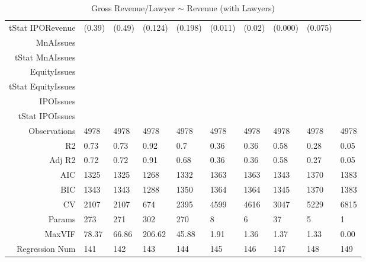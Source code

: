 \begin{table}[ht]
\begin{tabular}{rlllllllll}
  tStat IPORevenue & (0.39) & (0.49) & (0.124) & (0.198) & (0.011) & (0.02) & (0.000) & (0.075) &  \\ 
  MnAIssues &  &  &  &  &  &  &  &  &  \\ 
  tStat MnAIssues &  &  &  &  &  &  &  &  &  \\ 
  EquityIssues &  &  &  &  &  &  &  &  &  \\ 
  tStat EquityIssues &  &  &  &  &  &  &  &  &  \\ 
  IPOIssues &  &  &  &  &  &  &  &  &  \\ 
  tStat IPOIssues &  &  &  &  &  &  &  &  &  \\ 
  Observations & 4978 & 4978 & 4978 & 4978 & 4978 & 4978 & 4978 & 4978 & 4978 \\ 
  R2 & 0.73 & 0.73 & 0.92 & 0.7 & 0.36 & 0.36 & 0.58 & 0.28 & 0.05 \\ 
  Adj R2 & 0.72 & 0.72 & 0.91 & 0.68 & 0.36 & 0.36 & 0.58 & 0.27 & 0.05 \\ 
  AIC & 1325 & 1325 & 1268 & 1332 & 1363 & 1363 & 1343 & 1370 & 1383 \\ 
  BIC & 1343 & 1343 & 1288 & 1350 & 1364 & 1364 & 1345 & 1370 & 1383 \\ 
  CV & 2107 & 2107 & 674 & 2395 & 4599 & 4616 & 3047 & 5229 & 6815 \\ 
  Params & 273 & 271 & 302 & 270 & 8 & 6 & 37 & 5 & 1 \\ 
  MaxVIF & 78.37 & 66.86 & 206.62 & 45.88 & 1.91 & 1.36 & 1.37 & 1.33 & 0.00 \\ 
  Regression Num & 141 & 142 & 143 & 144 & 145 & 146 & 147 & 148 & 149 \\ 
   \hline
\end{tabular}
\caption{Gross Revenue/Lawyer $\sim$ Revenue (with Lawyers)} 
\end{table}
